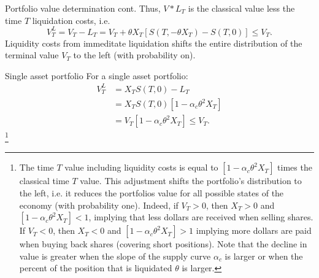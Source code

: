 \documentclass[compress, 10pt, notes]{beamer}  %
\begin{document}

\begin{frame}{Portfolio value determination cont.}
    Thus, $V*L_T$ is the classical value less the time $T$ liquidation costs, i.e.
    \begin{equation*}
        V^L_T = V_T - L_T = V_T + \theta X_T[S(T,-\theta X_T) - S(T,0)] \leq V_T.
    \end{equation*}
    Liquidity costs from immeditate liquidation shifts the entire distribution of the terminal value $V_T$ to the left (with probability on).
\end{frame}

\begin{frame}{Single asset portfolio}
    For a single asset portfolio:
    \begin{align*}
        V_T^L &= X_T S(T,0) - L_T \\
        &= X_T S(T,0)[1 - \alpha_c \theta^2 X_T] \\
        &= V_T[1 - \alpha_c \theta^2 X_T] \leq V_T.
    \end{align*}\footnote{The time $T$ value including liquidity costs is equal to $[1 - \alpha_c \theta^2 X_T]$ times the
    classical time $T$ value. This adjustment shifts the portfolio's distribution
    to the left, i.e. it reduces the portfolios value for all possible states of the
    economy (with probability one). Indeed, if $V_T > 0$, then $X_T > 0$ and
    $[1 - \alpha_c \theta^2 X_T] < 1$, implying that less dollars are received when selling shares.
    If $V_T < 0$, then $X_T < 0$ and $[1 - \alpha_c \theta^2 X_T] > 1$ implying more dollars are paid
    when buying back shares (covering short positions). Note that the decline
    in value is greater when the slope of the supply curve $\alpha_c$ is larger or when
    the percent of the position that is liquidated $\theta$ is larger.}
\end{frame}
\end{document}
